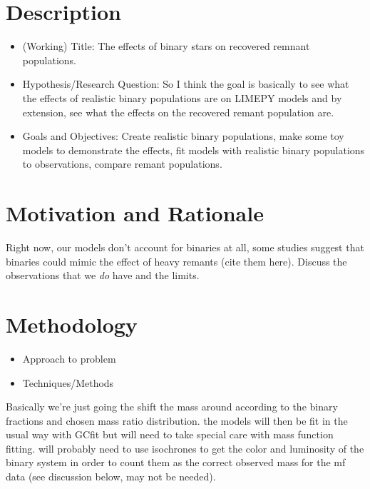 \documentclass[12pt,letterpaper]{article}
\newcommand{\software}[1]{\textrm{\MakeUppercase{#1}}}
\begin{document}
\section{Description}
\begin{itemize}
\item (Working) Title: The effects of binary stars on recovered remnant populations.
	\item Hypothesis/Research Question: So I think the goal is basically to see what the effects
	      of realistic binary populations are on \software{limepy} models and by extension, see
	      what the effects on the recovered remant population are.
	\item Goals and Objectives: Create realistic binary populations, make some toy models to
	      demonstrate the effects, fit models with realistic binary populations to observations,
	      compare remant populations.
\end{itemize}

\section{Motivation and Rationale}
Right now, our models don't account for binaries at all, some studies suggest that binaries could
mimic the effect of heavy remants (cite them here). Discuss the observations that we \emph{do} have
and the limits.


\section{Methodology}
\begin{itemize}
	\item Approach to problem
	\item Techniques/Methods


\end{itemize}

Basically we're just going the shift the mass around according to the binary fractions and chosen
mass ratio distribution. the models will then be fit in the usual way with GCfit but will need to
take special care with mass function fitting. will probably need to use isochrones to get the color
and luminosity of the binary system in order to count them as the correct observed mass for the mf
data (see discussion below, may not be needed).
\end{document}
